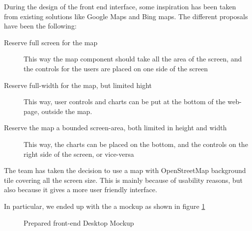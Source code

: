 \documentclass[11pt,a4paper,titlepage,oneside]{report}
\begin{document}
During the design of the front end interface, some inspiration has been taken from existing solutions like Google Maps and Bing maps. 
The different proposals have been the following:
\begin{description}
  \item[Reserve full screen for the map] This way the map component should take all the area of the screen, and the controls for the users are placed on one side of the screen
  \item[Reserve full-width for the map, but limited hight] This way, user controls and charts can be put at the bottom of the web-page, outside the map.
  \item[Reserve the map a bounded screen-area, both limited in height and width] This way, the charts can be placed on the bottom, and the controls on the right side of the screen, or vice-versa
\end{description}

The team has taken the decision to use a map with OpenStreetMap background tile covering all the screen size. This is mainly because of usability reasons, but also because it gives a more user friendly interface.

In particular, we ended up with the a mockup as shown in figure \ref{fig:FrontendMockup}

\begin{figure}[h]
\begin{center}
\caption{Prepared front-end Desktop Mockup}
\label{fig:FrontendMockup}
\end{center}
\end{figure}
\end{document}
